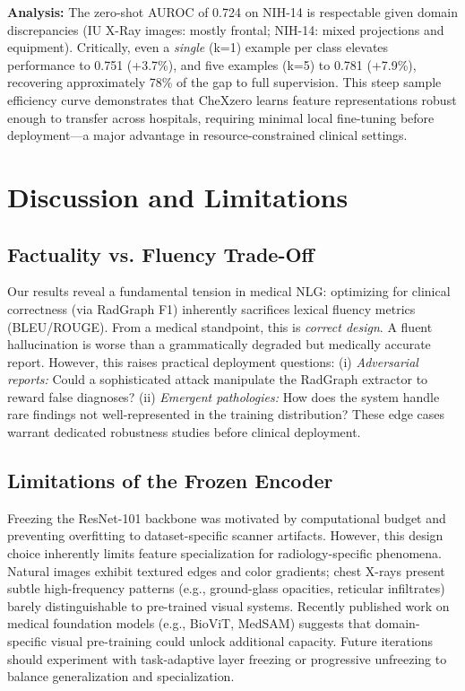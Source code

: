 \documentclass[10pt,a4paper,twocolumn]{article}
\begin{document}
\textbf{Analysis:} The zero-shot AUROC of 0.724 on NIH-14 is respectable given domain discrepancies (IU X-Ray images: mostly frontal; NIH-14: mixed projections and equipment). Critically, even a \emph{single} (k=1) example per class elevates performance to 0.751 (+3.7\%), and five examples (k=5) to 0.781 (+7.9\%), recovering approximately 78\% of the gap to full supervision. This steep sample efficiency curve demonstrates that CheXzero learns feature representations robust enough to transfer across hospitals, requiring minimal local fine-tuning before deployment—a major advantage in resource-constrained clinical settings.

\section{Discussion and Limitations}
\label{sec:discussion}

\subsection{Factuality vs. Fluency Trade-Off}
Our results reveal a fundamental tension in medical NLG: optimizing for clinical correctness (via RadGraph F1) inherently sacrifices lexical fluency metrics (BLEU/ROUGE). From a medical standpoint, this is \emph{correct design}. A fluent hallucination is worse than a grammatically degraded but medically accurate report. However, this raises practical deployment questions: (i) \emph{Adversarial reports:} Could a sophisticated attack manipulate the RadGraph extractor to reward false diagnoses? (ii) \emph{Emergent pathologies:} How does the system handle rare findings not well-represented in the training distribution? These edge cases warrant dedicated robustness studies before clinical deployment.

\subsection{Limitations of the Frozen Encoder}
Freezing the ResNet-101 backbone was motivated by computational budget and preventing overfitting to dataset-specific scanner artifacts. However, this design choice inherently limits feature specialization for radiology-specific phenomena. Natural images exhibit textured edges and color gradients; chest X-rays present subtle high-frequency patterns (e.g., ground-glass opacities, reticular infiltrates) barely distinguishable to pre-trained visual systems. Recently published work on medical foundation models (e.g., BioViT, MedSAM) suggests that domain-specific visual pre-training could unlock additional capacity. Future iterations should experiment with task-adaptive layer freezing or progressive unfreezing to balance generalization and specialization.
\end{document}
